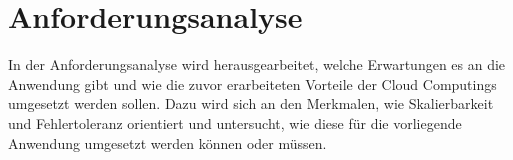 \section{Anforderungsanalyse}

In der Anforderungsanalyse wird herausgearbeitet, welche Erwartungen es an die Anwendung gibt und wie die zuvor erarbeiteten Vorteile der Cloud Computings umgesetzt werden sollen. Dazu wird sich an den Merkmalen, wie Skalierbarkeit und Fehlertoleranz orientiert und untersucht, wie diese für die vorliegende Anwendung umgesetzt werden können oder müssen.